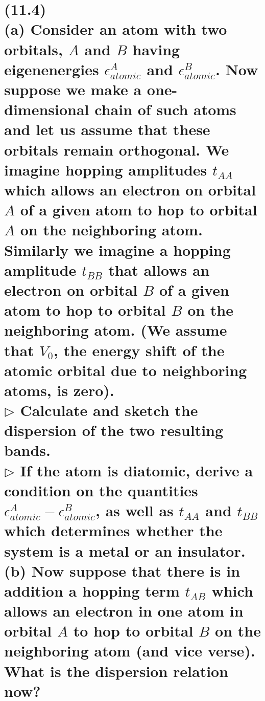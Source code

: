 \documentclass[reqno,a4paper,12pt]{amsart}
\begin{document}
\section{\textbf{(11.4)} \\
(a) Consider an atom with two orbitals, $A$ and $B$ having eigenenergies $\epsilon_{atomic}^A$ and $\epsilon_{atomic}^B$. Now suppose we make a one-dimensional chain of such atoms and let us assume that these orbitals remain orthogonal. We imagine hopping amplitudes $t_{AA}$ which allows an electron on orbital $A$ of a given atom to hop to orbital $A$ on the neighboring atom. Similarly we imagine a hopping amplitude $t_{BB}$ that allows an electron on orbital $B$ of a given atom to hop to orbital $B$ on the neighboring atom. (We assume that $V_0$, the energy shift of the atomic orbital due to neighboring atoms, is zero). \\
$\triangleright$ Calculate and sketch the dispersion of the two resulting bands. \\
$\triangleright$ If the atom is diatomic, derive a condition on the quantities $\epsilon_{atomic}^A - \epsilon_{atomic}^B$, as well as $t_{AA}$ and $t_{BB}$ which determines whether the system is a metal or an insulator. \\
(b) Now suppose that there is in addition a hopping term $t_{AB}$ which allows an electron in one atom in orbital $A$ to hop to orbital $B$ on the neighboring atom (and vice verse). What is the dispersion relation now?
}
\end{document}
